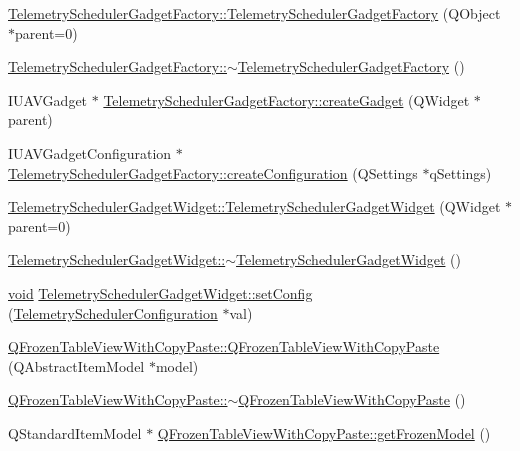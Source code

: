 \begin{DoxyCompactItemize}
\item 
\hyperlink{group___telemetry_scheduler_gadget_plugin_gaedbbe99f590cc8a0e230cf23937f7316}{\-Telemetry\-Scheduler\-Gadget\-Factory\-::\-Telemetry\-Scheduler\-Gadget\-Factory} (\-Q\-Object $\ast$parent=0)
\item 
\hyperlink{group___telemetry_scheduler_gadget_plugin_ga47b5dde062b0523950233697f47b9420}{\-Telemetry\-Scheduler\-Gadget\-Factory\-::$\sim$\-Telemetry\-Scheduler\-Gadget\-Factory} ()
\item 
\-I\-U\-A\-V\-Gadget $\ast$ \hyperlink{group___telemetry_scheduler_gadget_plugin_ga629a61572510189951830b25d358fcef}{\-Telemetry\-Scheduler\-Gadget\-Factory\-::create\-Gadget} (\-Q\-Widget $\ast$parent)
\item 
\-I\-U\-A\-V\-Gadget\-Configuration $\ast$ \hyperlink{group___telemetry_scheduler_gadget_plugin_ga63743e652574ec8f92d48017d86250a3}{\-Telemetry\-Scheduler\-Gadget\-Factory\-::create\-Configuration} (\-Q\-Settings $\ast$q\-Settings)
\item 
\hyperlink{group___telemetry_scheduler_gadget_plugin_gaa1033c34c3bb84642fb5c9096c2689ab}{\-Telemetry\-Scheduler\-Gadget\-Widget\-::\-Telemetry\-Scheduler\-Gadget\-Widget} (\-Q\-Widget $\ast$parent=0)
\item 
\hyperlink{group___telemetry_scheduler_gadget_plugin_gae6a59d9c688634b35de1e64c3ad1e4e7}{\-Telemetry\-Scheduler\-Gadget\-Widget\-::$\sim$\-Telemetry\-Scheduler\-Gadget\-Widget} ()
\item 
\hyperlink{group___u_a_v_objects_plugin_ga444cf2ff3f0ecbe028adce838d373f5c}{void} \hyperlink{group___telemetry_scheduler_gadget_plugin_gad90b204c2dc0fef1a0c92b94c324808a}{\-Telemetry\-Scheduler\-Gadget\-Widget\-::set\-Config} (\hyperlink{class_telemetry_scheduler_configuration}{\-Telemetry\-Scheduler\-Configuration} $\ast$val)
\item 
\hyperlink{group___telemetry_scheduler_gadget_plugin_gad6560fd1799cf89e95a319a596faea44}{\-Q\-Frozen\-Table\-View\-With\-Copy\-Paste\-::\-Q\-Frozen\-Table\-View\-With\-Copy\-Paste} (\-Q\-Abstract\-Item\-Model $\ast$model)
\item 
\hyperlink{group___telemetry_scheduler_gadget_plugin_gacf27881593c1df76a7dad9ec53717a0f}{\-Q\-Frozen\-Table\-View\-With\-Copy\-Paste\-::$\sim$\-Q\-Frozen\-Table\-View\-With\-Copy\-Paste} ()
\item 
\-Q\-Standard\-Item\-Model $\ast$ \hyperlink{group___telemetry_scheduler_gadget_plugin_ga7f698a3c329ebf8c55cddcf371f0b202}{\-Q\-Frozen\-Table\-View\-With\-Copy\-Paste\-::get\-Frozen\-Model} ()

\end{DoxyCompactItemize}
